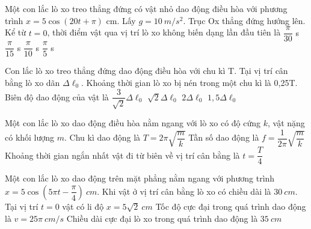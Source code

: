 \begin{ex}%
Một con lắc lò xo treo thẳng đứng có vật nhỏ dao động điều hòa với phương trình $x = 5\cos (20t + \pi )$ cm. Lấy $g = 10\ m/s^2$. Trục Ox thẳng đứng hướng lên. Kể từ $t = 0$, thời điểm vật qua vị trí lò xo không biến dạng lần đầu tiên là
\choice
{\True $ \dfrac{\pi}{30} $ s}
{$ \dfrac{\pi}{15} $ s}
{$ \dfrac{\pi}{10} $ s}
{$ \dfrac{\pi}{5} $ s}
\end{ex} 
\begin{ex}%
Con lắc lò xo treo thẳng đứng dao động điều hòa với chu kì T. Tại vị trí cân bằng lò xo dãn $\Delta \ell_0$. Khoảng thời gian lò xo bị nén trong một chu kì là 0,25T. Biên độ dao động của vật là
\choice
{$\dfrac{3}{\sqrt{2}}\Delta \ell_0 $}
{\True $\sqrt{2}\Delta \ell_0 $}
{$2\Delta \ell_0 $}
{$1,5\Delta \ell_0 $}
\end{ex} 
\begin{ex}%
Một con lắc lò xo dao động điều hòa nằm ngang với lò xo có độ cứng $k$, vật nặng có khối lượng $m$.
{\True Chu kì dao động là $T=2 \pi \sqrt{\dfrac{m}{k}}$}
{Tần số dao động là $f=\dfrac{1}{2 \pi} \sqrt{\dfrac{m}{k}}$}
{\True Khoảng thời gian ngắn nhất vật đi từ biên về vị trí cân bằng là $t=\dfrac{T}{4}$}
\end{ex} 
\begin{ex}%
Một con lắc lò xo dao động trên mặt phẳng nằm ngang với phương trình $x=5 \cos \left(5 \pi t-\dfrac{\pi}{4}\right)\ cm$. Khi vật ở vị trí cân bằng lò xo có chiều dài là $30 \ cm$.
{Tại vị trí $t=0$ vật có li độ $x=5 \sqrt{2}\ cm$}
{\True Tốc độ cực đại trong quá trình dao động là $v=25 \pi\ cm/s$}
{\True Chiều dài cực đại lò xo trong quá trình dao động là $35 \ cm$}
\end{ex} 
